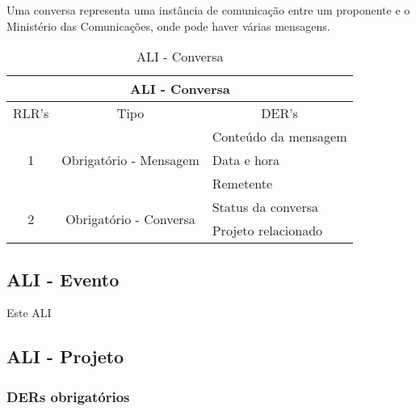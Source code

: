       Uma conversa representa uma instância de comunicação entre um proponente e o Ministério das Comunicações,
      onde pode haver várias mensagens.
    
      \begin{table}[!h]
      \centering
      \caption{ALI - Conversa}
      \label{my-label}
      \begin{tabular}{|c|c|l|}
      \hline
      \multicolumn{3}{|c|}{ALI - Conversa}                                                    \\ \hline
      \multicolumn{1}{|l|}{RLR's} & Tipo                         & \multicolumn{1}{c|}{DER's} \\ \hline
      \multirow{3}{*}{1}          & \multirow{3}{*}{Obrigatório - Mensagem} & Conteúdo da mensagem       \\ \cline{3-3} 
				  &                              & Data e hora                \\ \cline{3-3} 
				  &                              & Remetente                  \\ \hline
      \multirow{2}{*}{2}          & \multirow{2}{*}{Obrigatório - Conversa} & Status da conversa         \\ \cline{3-3} 
				  &                              & Projeto relacionado        \\ \hline
      \end{tabular}
      \end{table}
     
    \subsection{ALI - Evento}
      
      Este ALI
     
    \vfill
    \pagebreak
    \subsection{ALI - Projeto}
      
      \subsubsection*{DERs obrigatórios}
      
